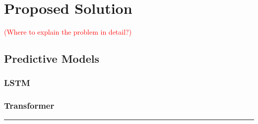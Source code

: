 \chapter{Proposed Solution}
\label{chapter:proposed_solution}

\textcolor{red}{(Where to explain the problem in detail?)}

\section{Predictive Models}

\subsection{LSTM}

\subsection{Transformer}

{\color{red} \rule{\linewidth}{0.5mm}}

